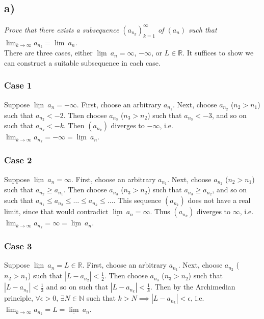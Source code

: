 \documentclass[12pt]{article}
\begin{document}
\subsection*{ a)}
{\it Prove that there exists a subsequence $(a_{n_{k}})_{k=1}^{\infty}$ of $(a_n)$ such that $\lim_{k\rightarrow\infty}a_{n_{k}} = \underline{\lim}\ a_n$.} \\

There are three cases, either $\underline{\lim}\ a_n = \infty$, $-\infty$, or $L \in \mathbb{R}$.  It suffices to show we can construct a suitable subsequence in each case.

\subsubsection*{Case 1}

Suppose $\underline{\lim}\ a_n = -\infty$.  First, choose an arbitrary $a_{n_1}$.  Next, choose $a_{n_2}$ ($n_2 > n_1$) such that $a_{n_2} < -2$.  Then choose $a_{n_3}$ ($n_3 > n_2$) such that $a_{n_3} < -3$, and so on such that $a_{n_k} < -k$.  Then $(a_{n_k})$ diverges to $-\infty$, i.e. $\lim_{k\rightarrow\infty}a_{n_{k}} = -\infty = \underline{\lim}\ a_n$.

\subsubsection*{Case 2}

Suppose $\underline{\lim}\ a_n = \infty$.  First, choose an arbitrary $a_{n_1}$.  Next, choose $a_{n_2}$ ($n_2 > n_1$) such that $a_{n_2} \geq a_{n_1}$.  Then choose $a_{n_3}$ ($n_3 > n_2$) such that $a_{n_3} \geq a_{n_2}$, and so on such that $a_{n_1} \leq a_{n_2} \leq \dots \leq a_{n_k} \leq \dots$.  This sequence $(a_{n_k})$ does not have a real limit, since that would contradict $\underline{\lim}\ a_n = \infty$.  Thus $(a_{n_k})$ diverges to $\infty$, i.e. $\lim_{k\rightarrow\infty}a_{n_{k}} = \infty = \underline{\lim}\ a_n$.

\subsubsection*{Case 3}

Suppose $\underline{\lim}\ a_n = L \in \mathbb{R}$.  First, choose an arbitrary $a_{n_1}$.  Next, choose $a_{n_2}$ ($n_2 > n_1$) such that $|L - a_{n_2}| < \frac{1}{2}$.  Then choose $a_{n_3}$ ($n_3 > n_2$) such that $|L - a_{n_3}| < \frac{1}{3}$ and so on such that $|L - a_{n_k}| < \frac{1}{k}$.  Then by the Archimedian principle, $\forall\epsilon > 0$, $\exists N \in \mathbb{N}$ such that $k > N \implies |L - a_{n_k}| < \epsilon$, i.e. $\lim_{k\rightarrow\infty} a_{n_k} = L = \underline{\lim}\ a_n$.
\end{document}
